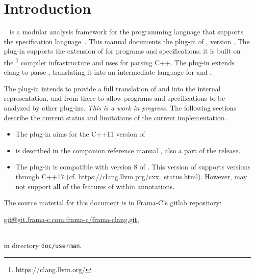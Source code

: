 \chapter{Introduction}

\framac~\cite{userman,fac15} is a modular analysis framework for the \C
programming language that supports the \acsl specification
language~\cite{acsl}. This manual documents the \fclang plug-in of \framac,
version \fclangversion. 
The \fclang plug-in supports the \acslpp extension of \acsl for \cpp programs and specifications; 
it is built on the \clang\footnote{https://clang.llvm.org/} compiler infrastructure and uses \clang for 
parsing C++. The plug-in extends clang to parse \acslpp, translating it into an intermediate language for \C and \acsl.

The \fclang plug-in intends to provide a full translation of \cpp and \acslpp into the \framac internal representation, and from there to allow \cpp programs and \acslpp specifications to be analyzed by other \framac plug-ins. 
\textit{This is a work in progress.}
The following sections describe the current status and limitations of the current implementation.
\begin{itemize}
	\item The plug-in aims for the C++11 version of \cpp
	\item \acslpp is described in the companion \acslpp reference manual \cite{acslpp}, also a part of the \framac release.
    \item The plug-in is compatible with version 8 of \clang. 
    This version of \clang supports \cpp versions through C++17 
    (cf. \url{https://clang.llvm.prg/cxx_status.html}). 
    However, \fclang may not support all of the features of \cpp within annotations.
\end{itemize}

The source material for this document is in Frama-C's gitlab repository:\\ \centerline{\url{git@git.frama-c.com:frama-c/frama-clang.git},} \\
 in directory \lstinline|doc/userman|.

